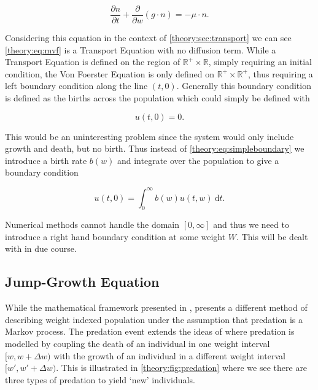 \documentclass[../main.tex]{subfiles}
\begin{document}
  \begin{equation}\label{theory:eq:mvf}
    \frac{\partial n}{\partial t} + \frac{\partial}{\partial w} \left(g \cdot n \right) = - \mu \cdot n.
  \end{equation}

  Considering this equation in the context of \autoref{theory:sec:transport} we can see \autoref{theory:eq:mvf} is a Transport Equation with no diffusion term. While a Transport Equation is defined on the region of $\mathbb{R^+} \times \mathbb{R}$, simply requiring an initial condition, the Von Foerster Equation is only defined on $\mathbb{R^+} \times \mathbb{R^+}$, thus requiring a left boundary condition along the line $(t, 0)$. Generally this boundary condition is defined as the births across the population which could simply be defined with

  \begin{equation}\label{theory:eq:simpleboundary}
    u(t, 0) = 0.
  \end{equation}

  This would be an uninteresting problem since the system would only include growth and death, but no birth. Thus instead of \autoref{theory:eq:simpleboundary} we introduce a birth rate $b(w)$ and integrate over the population to give a boundary condition

  \begin{equation}\label{theory:eq:boundary}
    u(t, 0) = \int_0^{\infty} b(w) u(t, w) \: \mathrm{d}t.
  \end{equation}

  Numerical methods cannot handle the domain $[0, \infty]$ and thus we need to introduce a right hand boundary condition at some weight $W$. This will be dealt with in due course.

  \subsection{Jump-Growth Equation}\label{theory:sec:jumpgrowth}
  While the mathematical framework presented in \cite{silvert1978}, \cite{datta2010} presents a different method of describing weight indexed population under the assumption that predation is a Markov process. The predation event extends the ideas of \cite{silvert1980} where predation is modelled by coupling the death of an individual in one weight interval $[w, w + \Delta w)$ with the growth of an individual in a different weight interval $[w', w' + \Delta w)$. This is illustrated in \autoref{theory:fig:predation} where we see there are three types of predation to yield `new' individuals.
\end{document}

